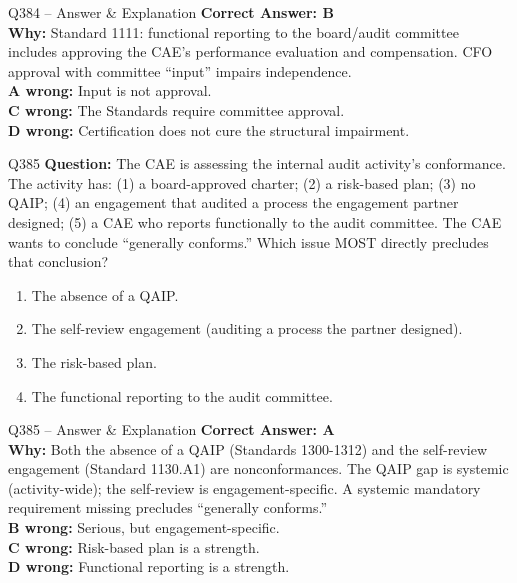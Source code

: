 \documentclass[aspectratio=169,10pt]{beamer}
\begin{document}
	\begin{frame}[t]{Q384 -- Answer \& Explanation}
		\small
		\textbf{Correct Answer: B} \\[4pt]
		\textbf{Why:} Standard 1111: functional reporting to the board/audit committee includes approving the CAE's performance evaluation and compensation. CFO approval with committee ``input'' impairs independence. \\[4pt]
		\textbf{A wrong:} Input is not approval. \\[2pt]
		\textbf{C wrong:} The Standards require committee approval. \\[2pt]
		\textbf{D wrong:} Certification does not cure the structural impairment.
	\end{frame}
	
	\begin{frame}[t]{Q385}
		\small
		\textbf{Question:} The CAE is assessing the internal audit activity's conformance. The activity has: (1) a board-approved charter; (2) a risk-based plan; (3) no QAIP; (4) an engagement that audited a process the engagement partner designed; (5) a CAE who reports functionally to the audit committee. The CAE wants to conclude ``generally conforms.'' Which issue MOST directly precludes that conclusion?
		\begin{enumerate}[label=\Alph*.,itemsep=1pt,topsep=2pt]
			\item The absence of a QAIP.
			\item The self-review engagement (auditing a process the partner designed).
			\item The risk-based plan.
			\item The functional reporting to the audit committee.
		\end{enumerate}
	\end{frame}
	
	\begin{frame}[t]{Q385 -- Answer \& Explanation}
		\small
		\textbf{Correct Answer: A} \\[4pt]
		\textbf{Why:} Both the absence of a QAIP (Standards 1300-1312) and the self-review engagement (Standard 1130.A1) are nonconformances. The QAIP gap is systemic (activity-wide); the self-review is engagement-specific. A systemic mandatory requirement missing precludes ``generally conforms.'' \\[4pt]
		\textbf{B wrong:} Serious, but engagement-specific. \\[2pt]
		\textbf{C wrong:} Risk-based plan is a strength. \\[2pt]
		\textbf{D wrong:} Functional reporting is a strength.
	\end{frame}
	
\end{document}
